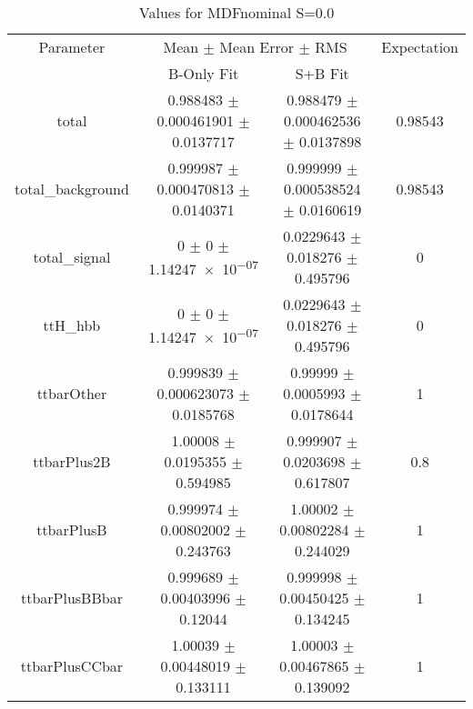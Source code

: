 \begin{table}
\centering
\caption{Values for MDFnominal S=0.0}
\begin{tabular}{cccc}
\toprule
Parameter & \multicolumn{2}{c}{Mean $\pm$ Mean Error $\pm$ RMS} & Expectation\\
 & B-Only Fit & S+B Fit & \\
\midrule
total & \num{0.988483} $\pm$ \num{0.000461901} $\pm$ \num{0.0137717} & \num{0.988479} $\pm$ \num{0.000462536} $\pm$ \num{0.0137898} & \num{0.98543}\\
total\_background & \num{0.999987} $\pm$ \num{0.000470813} $\pm$ \num{0.0140371} & \num{0.999999} $\pm$ \num{0.000538524} $\pm$ \num{0.0160619} & \num{0.98543}\\
total\_signal & \num{0} $\pm$ \num{0} $\pm$ \num{1.14247e-07} & \num{0.0229643} $\pm$ \num{0.018276} $\pm$ \num{0.495796} & \num{0}\\
ttH\_hbb & \num{0} $\pm$ \num{0} $\pm$ \num{1.14247e-07} & \num{0.0229643} $\pm$ \num{0.018276} $\pm$ \num{0.495796} & \num{0}\\
ttbarOther & \num{0.999839} $\pm$ \num{0.000623073} $\pm$ \num{0.0185768} & \num{0.99999} $\pm$ \num{0.0005993} $\pm$ \num{0.0178644} & \num{1}\\
ttbarPlus2B & \num{1.00008} $\pm$ \num{0.0195355} $\pm$ \num{0.594985} & \num{0.999907} $\pm$ \num{0.0203698} $\pm$ \num{0.617807} & \num{0.8}\\
ttbarPlusB & \num{0.999974} $\pm$ \num{0.00802002} $\pm$ \num{0.243763} & \num{1.00002} $\pm$ \num{0.00802284} $\pm$ \num{0.244029} & \num{1}\\
ttbarPlusBBbar & \num{0.999689} $\pm$ \num{0.00403996} $\pm$ \num{0.12044} & \num{0.999998} $\pm$ \num{0.00450425} $\pm$ \num{0.134245} & \num{1}\\
ttbarPlusCCbar & \num{1.00039} $\pm$ \num{0.00448019} $\pm$ \num{0.133111} & \num{1.00003} $\pm$ \num{0.00467865} $\pm$ \num{0.139092} & \num{1}\\
\bottomrule
\end{tabular}
\end{table}